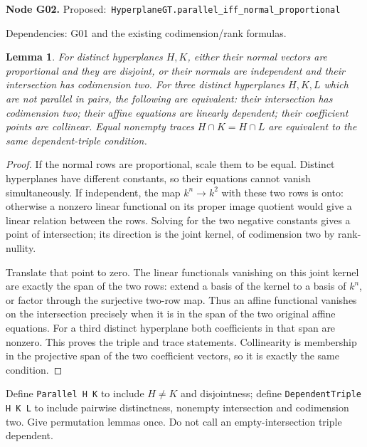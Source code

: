 \documentclass[11pt]{article}
\newtheorem{lemma}[theorem]{Lemma}
\theoremstyle{remark}\newtheorem{remark}[theorem]{Remark}
\newcommand{\code}[1]{\nolinkurl{#1}}
\newcommand{\node}[3]{\par\Needspace{8\baselineskip}\smallskip\noindent\textbf{Node #1.}\quad
 \textsf{Proposed:}\ \code{#2}\par\noindent
 \textsf{Dependencies:} #3.\par\smallskip}
\begin{document}
\node{G02}{HyperplaneGT.parallel_iff_normal_proportional}{G01 and the existing codimension/rank formulas}
\begin{lemma}\label{lem:g02}
For distinct hyperplanes $H,K$, either their normal vectors are
proportional and they are disjoint, or their normals are independent
and their intersection has codimension two. For three distinct
hyperplanes $H,K,L$ which are not parallel in pairs, the following
are equivalent: their intersection has codimension two; their affine
equations are linearly dependent; their coefficient points are
collinear. Equal nonempty traces $H\cap K=H\cap L$ are equivalent
to the same dependent-triple condition.
\end{lemma}
\begin{proof}
If the normal rows are proportional, scale them to be equal. Distinct
hyperplanes have different constants, so their equations cannot
vanish simultaneously. If independent, the map $k^n\to k^2$ with
these two rows is onto: otherwise a nonzero linear functional on its
proper image quotient would give a linear relation between the rows.
Solving for the two negative constants gives a point of intersection;
its direction is the joint kernel, of codimension two by rank-nullity.

Translate that point to zero. The linear functionals vanishing on
this joint kernel are exactly the span of the two rows: extend a
basis of the kernel to a basis of $k^n$, or factor through the
surjective two-row map. Thus an affine functional vanishes on the
intersection precisely when it is in the span of the two original
affine equations. For a third distinct hyperplane both coefficients
in that span are nonzero. This proves the triple and trace statements.
Collinearity is membership in the projective span of the two
coefficient vectors, so it is exactly the same condition.
\end{proof}
Define \texttt{Parallel H K} to include $H\ne K$ and disjointness;
define \texttt{DependentTriple H K L} to include pairwise distinctness,
nonempty intersection and codimension two. Give permutation lemmas
once. Do not call an empty-intersection triple dependent.
\end{document}
